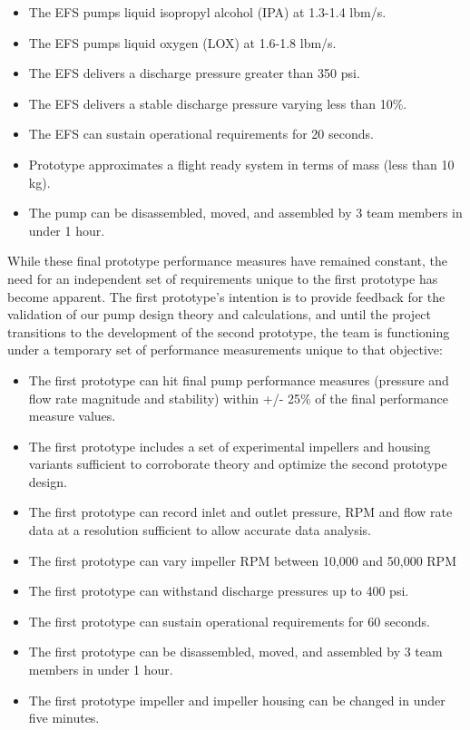 \documentclass[11pt,twoside,a4paper,openright]{report}
\begin{document}
\begin{itemize}
\item The EFS pumps liquid isopropyl alcohol (IPA) at 1.3-1.4 lbm/s.
\item The EFS pumps liquid oxygen (LOX) at 1.6-1.8 lbm/s.
\item The EFS delivers a discharge pressure greater than 350 psi.
\item The EFS delivers a stable discharge pressure varying less than 10\%.
\item The EFS can sustain operational requirements for 20 seconds.
\item Prototype approximates a flight ready system in terms of mass (less than 10 kg).
\item The pump can be disassembled, moved, and assembled by 3 team members in under 1 hour. 
\end{itemize}

While these final prototype performance measures have remained constant, the need for an independent set of requirements unique to the first prototype has become apparent. The first prototype’s intention is to provide feedback for the validation of our pump design theory and calculations, and until the project transitions to the development of the second prototype, the team is functioning under a temporary set of performance measurements unique to that objective:

\begin{itemize}
\item The first prototype can hit final pump  performance measures (pressure and flow rate magnitude and stability) within +/- 25\% of the final performance measure values. 
\item The first prototype includes a set of experimental impellers and housing variants sufficient to corroborate theory and optimize the second prototype design.
\item The first prototype can record inlet and outlet pressure, RPM and flow rate data at a resolution sufficient to allow accurate data analysis.
\item The first prototype can vary impeller RPM between 10,000 and 50,000 RPM
\item The first prototype can withstand discharge pressures up to 400 psi.
\item The first prototype can sustain operational requirements for 60 seconds.
\item The first prototype can be disassembled, moved, and assembled by 3 team members in under 1 hour. 
\item The first prototype impeller and impeller housing can be changed in under five minutes.
\end{itemize}
\end{document}
